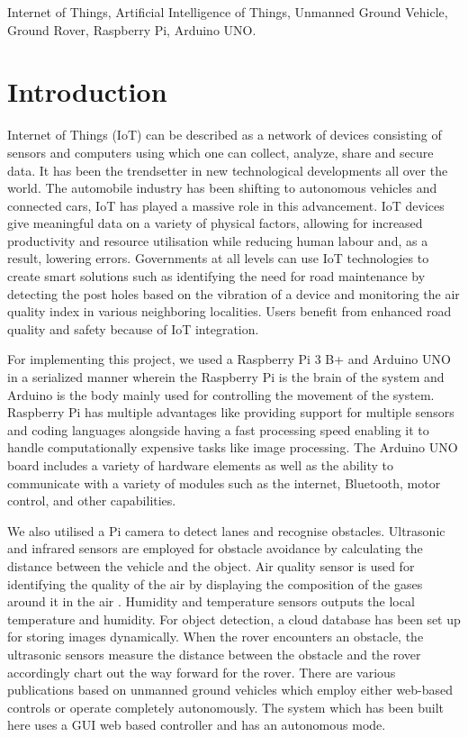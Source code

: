 \documentclass[conference,a4paper]{IEEEtran}
\begin{document}
\begin{IEEEkeywords}
Internet of Things, Artificial Intelligence of Things, Unmanned Ground Vehicle, Ground Rover, Raspberry Pi, Arduino UNO.
\end{IEEEkeywords}

\section{Introduction}

Internet of Things (IoT) can be described as a network of devices consisting of sensors and computers using which one can collect, analyze, share and secure data.
It has been the trendsetter in new technological developments all over the world. The automobile industry has been shifting to autonomous vehicles and connected cars, IoT has played a massive role in this advancement\cite{8}. IoT devices give meaningful data on a variety of physical factors, allowing for increased productivity and resource utilisation while reducing human labour and, as a result, lowering errors. Governments at all levels can use IoT technologies to create smart solutions such as identifying the need for road maintenance by detecting the post holes based on the vibration of a device and monitoring the air quality index in various neighboring localities. Users benefit from enhanced road quality and safety because of IoT integration.

For implementing this project, we used a Raspberry Pi 3 B+ and Arduino UNO in a serialized manner wherein the Raspberry Pi is the brain of the system and Arduino is the body mainly used for controlling the movement of the system. Raspberry Pi has multiple advantages like providing support for multiple sensors and coding languages alongside having a fast processing speed enabling it to handle computationally expensive tasks like image processing. The Arduino UNO board includes a variety of hardware elements as well as the ability to communicate with a variety of modules such as the internet, Bluetooth, motor control, and other capabilities.

We also utilised a Pi camera to detect lanes and recognise obstacles. Ultrasonic and infrared sensors are employed for obstacle avoidance by calculating the distance between the vehicle and the object\cite{9}. Air quality sensor is used for identifying the quality of the air by displaying the composition of the gases around it in the air \cite{3}. Humidity and temperature sensors outputs the local temperature and humidity. For object detection, a cloud database has been set up for storing images dynamically. When the rover encounters an obstacle, the ultrasonic sensors measure the distance between the obstacle and the rover accordingly chart out the way forward for the rover.
There are various publications based on unmanned ground vehicles which employ either web-based controls or operate completely autonomously. The system which has been built here uses a GUI web based controller and has an autonomous mode.
\end{document}
